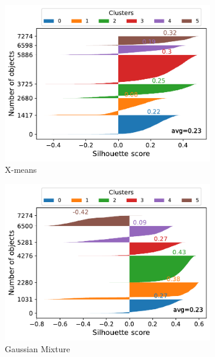 \documentclass[10pt, a4paper, twocolumn]{article}
\begin{document}
\begin{figure}[t]
\begin{subfigure}[t]{0.196\textwidth}
        \includegraphics[width=\linewidth]{immagini simone/xmeans_silh_plot.pdf}
        \caption{X-means}
        \label{fig:xmeans_silh}
    \end{subfigure}  
    \begin{subfigure}[t]{0.196\textwidth}
        \includegraphics[width=\linewidth]{immagini simone/gausmix_silh.pdf}
        \caption{Gaussian Mixture}
        \label{fig:gaussmix_silh}
    \end{subfigure}
    \begin{subfigure}[t]{0.196\textwidth}

\end{subfigure}
\end{figure}
\end{document}
